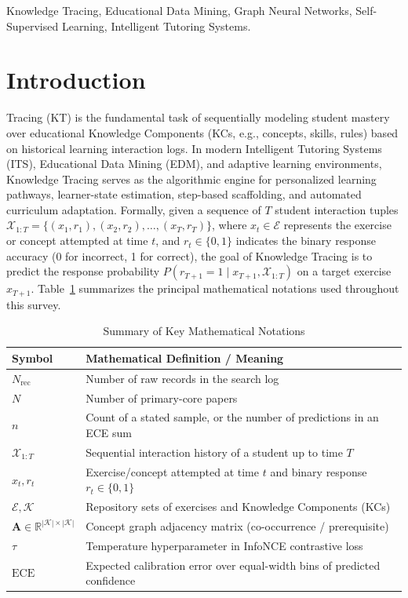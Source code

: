 \documentclass[lettersize,journal]{IEEEtran}
\begin{document}
\begin{IEEEkeywords}
Knowledge Tracing, Educational Data Mining, Graph Neural Networks, Self-Supervised Learning, Intelligent Tutoring Systems.
\end{IEEEkeywords}

\section{Introduction}
\label{sec:intro}

 Tracing (KT) is the fundamental task of sequentially modeling student mastery over educational Knowledge Components (KCs, e.g., concepts, skills, rules) based on historical learning interaction logs. In modern Intelligent Tutoring Systems (ITS), Educational Data Mining (EDM), and adaptive learning environments, Knowledge Tracing serves as the algorithmic engine for personalized learning pathways, learner-state estimation, step-based scaffolding, and automated curriculum adaptation. Formally, given a sequence of $T$ student interaction tuples $\mathcal{X}_{1:T} = \{(x_1, r_1), (x_2, r_2), \dots, (x_T, r_T)\}$, where $x_t \in \mathcal{E}$ represents the exercise or concept attempted at time $t$, and $r_t \in \{0, 1\}$ indicates the binary response accuracy (0 for incorrect, 1 for correct), the goal of Knowledge Tracing is to predict the response probability $P(r_{T+1} = 1 \mid x_{T+1}, \mathcal{X}_{1:T})$ on a target exercise $x_{T+1}$. Table~\ref{tab:notation_summary} summarizes the principal mathematical notations used throughout this survey.
\begin{table}[t]
\caption{Summary of Key Mathematical Notations}
\label{tab:notation_summary}
\centering
\footnotesize
\begin{tabular}{@{}lp{}@{}}
\toprule
\textbf{Symbol} & \textbf{Mathematical Definition / Meaning} \\
\midrule
$N_{\mathrm{rec}}$ & Number of raw records in the search log \\
$N$ & Number of primary-core papers \\
$n$ & Count of a stated sample, or the number of predictions in an ECE sum \\
$\mathcal{X}_{1:T}$ & Sequential interaction history of a student up to time $T$ \\
$x_t, r_t$ & Exercise/concept attempted at time $t$ and binary response $r_t \in \{0,1\}$ \\
$\mathcal{E}, \mathcal{K}$ & Repository sets of exercises and Knowledge Components (KCs) \\
$\mathbf{A} \in \mathbb{R}^{|\mathcal{K}| \times |\mathcal{K}|}$ & Concept graph adjacency matrix (co-occurrence / prerequisite) \\
$\tau$ & Temperature hyperparameter in InfoNCE contrastive loss \\
$\text{ECE}$ & Expected calibration error over equal-width bins of predicted confidence \\
\bottomrule
\end{tabular}
\end{table}
\end{document}
